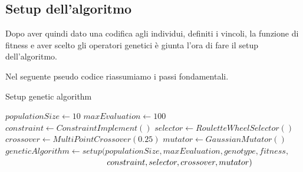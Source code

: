 \documentclass[a4paper, 11pt, oneside]{report}
\begin{document}
                \subsection{Setup dell'algoritmo}
                Dopo aver quindi dato una codifica agli individui, definiti i vincoli, la funzione di fitness e aver
                scelto gli operatori genetici è giunta l'ora di fare il setup dell'algoritmo.
                \par \noindent Nel seguente pseudo codice riassumiamo i passi fondamentali.
                \medskip
                \begin{algorithm}
                \caption{Setup genetic algorithm}
                    \label{setup:ga}
                    \begin{algorithmic}[1]
                        \State $populationSize \gets 10$
                        \State $maxEvaluation \gets 100$
                        \State
                        \State $constraint \gets ConstraintImplement()$
                        \State $selector \gets RouletteWheelSelector()$
                        \State $crossover \gets MultiPointCrossover(0.25)$
                        \State $mutator \gets GaussianMutator()$
                        \State
                        \State $geneticAlgorithm \gets setup(populationSize, maxEvaluation, genotype, fitness,$
                        \State $\hspace*{12.3em} constraint, selector, crossover, mutator)$
                    \end{algorithmic}
                \end{algorithm}

            \newpage
\end{document}
